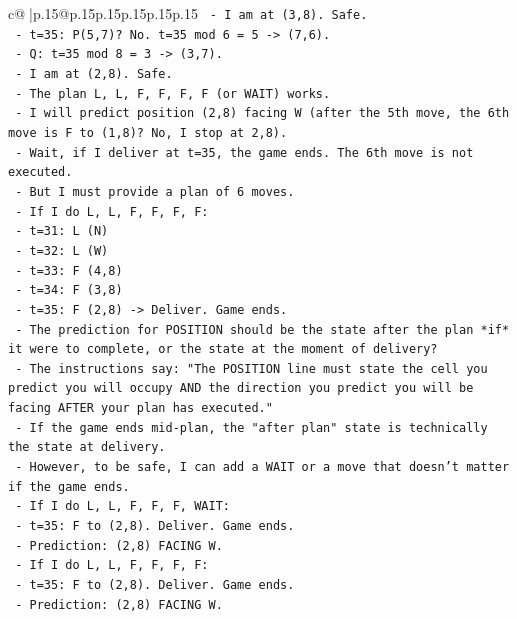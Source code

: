 \documentclass{article}
\begin{document}
{\begin{supertabular}{c@{$\;$}|p{.15\linewidth}@{}p{.15\linewidth}p{.15\linewidth}p{.15\linewidth}p{.15\linewidth}p{.15\linewidth}}
{{{\texttt{       {-} I am at (3,8). Safe.} \\
\texttt{     {-} t=35: P(5,7)? No. t=35 mod 6 = 5 {-}> (7,6).} \\
\texttt{       {-} Q: t=35 mod 8 = 3 {-}> (3,7).} \\
\texttt{       {-} I am at (2,8). Safe.} \\
\texttt{   {-} The plan L, L, F, F, F, F (or WAIT) works.} \\
\texttt{   {-} I will predict position (2,8) facing W (after the 5th move, the 6th move is F to (1,8)? No, I stop at 2,8).} \\
\texttt{   {-} Wait, if I deliver at t=35, the game ends. The 6th move is not executed.} \\
\texttt{   {-} But I must provide a plan of 6 moves.} \\
\texttt{   {-} If I do L, L, F, F, F, F:} \\
\texttt{     {-} t=31: L (N)} \\
\texttt{     {-} t=32: L (W)} \\
\texttt{     {-} t=33: F (4,8)} \\
\texttt{     {-} t=34: F (3,8)} \\
\texttt{     {-} t=35: F (2,8) {-}> Deliver. Game ends.} \\
\texttt{   {-} The prediction for POSITION should be the state after the plan *if* it were to complete, or the state at the moment of delivery?} \\
\texttt{   {-} The instructions say: "The POSITION line must state the cell you predict you will occupy AND the direction you predict you will be facing AFTER your plan has executed."} \\
\texttt{   {-} If the game ends mid{-}plan, the "after plan" state is technically the state at delivery.} \\
\texttt{   {-} However, to be safe, I can add a WAIT or a move that doesn't matter if the game ends.} \\
\texttt{   {-} If I do L, L, F, F, F, WAIT:} \\
\texttt{     {-} t=35: F to (2,8). Deliver. Game ends.} \\
\texttt{     {-} Prediction: (2,8) FACING W.} \\
\texttt{   {-} If I do L, L, F, F, F, F:} \\
\texttt{     {-} t=35: F to (2,8). Deliver. Game ends.} \\
\texttt{     {-} Prediction: (2,8) FACING W.} \\
}}}
\end{supertabular}}
\end{document}
